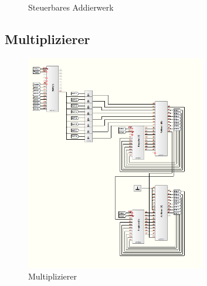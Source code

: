 \documentclass[a4paper,12pt,fleqn,oneside]{article}
\begin{document}
		\begin{figure}[h]
			\center
			
			\caption{Steuerbares Addierwerk}
			\label{fig:Addierwerk}
		\end{figure}
	\FloatBarrier



\newpage

	\subsection{Multiplizierer}

		\begin{figure}[h]
			\center
			\includegraphics[width=0.7\textwidth]{multiplizierer}
			\caption{Multiplizierer}
			\label{fig:Multiplizierer}
		\end{figure}
\end{document}
